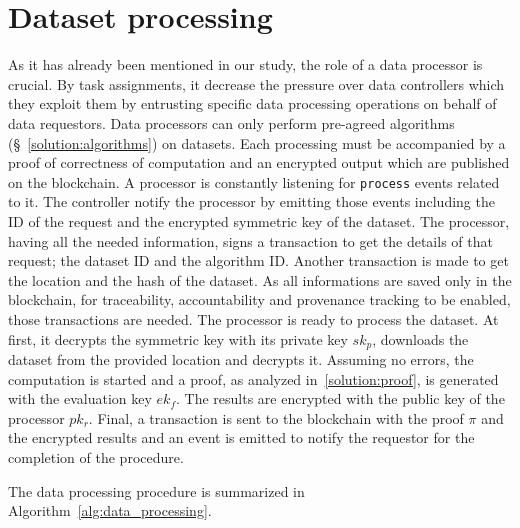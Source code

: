 \section{Dataset processing}
\label{solution:flow:pr_data}

As it has already been mentioned in our study, the role of a data processor is crucial. By task assignments, it decrease the pressure over data controllers which they exploit them by entrusting specific data processing operations on behalf of data requestors. Data processors can only perform pre-agreed algorithms (§~\ref{solution:algorithms}) on datasets. Each processing must be accompanied by a proof of correctness of computation and an encrypted output which are published on the blockchain. A processor is constantly listening for \verb|process| events related to it. The controller notify the processor by emitting those events including the ID of the request and the encrypted symmetric key of the dataset. The processor, having all the needed information, signs a transaction to get the details of that request; the dataset ID and the algorithm ID. Another transaction is made to get the location and the hash of the dataset. As all informations are saved only in the blockchain, for traceability, accountability and provenance tracking to be enabled, those transactions are needed. The processor is ready to process the dataset. At first, it decrypts the symmetric key with its private key $sk_p$, downloads the dataset from the provided location and decrypts it. Assuming no errors, the computation is started and a proof, as analyzed in~\ref{solution:proof}, is generated with the evaluation key $ek_f$. The results are encrypted with the public key of the processor $pk_r$. Final, a transaction is sent to the blockchain with the proof $\pi$ and the encrypted results and an event is emitted to notify the requestor for the completion of the procedure.

The data processing procedure is summarized in Algorithm~\ref{alg:data_processing}.

